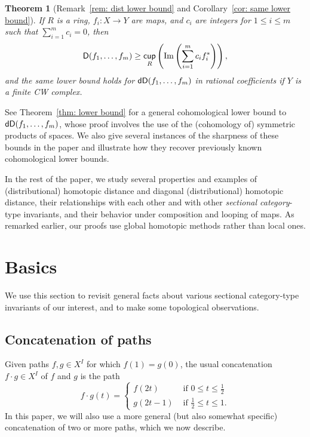 \documentclass[amscd,amssymb,verbatim,10pt]{amsart}
\numberwithin{equation}{section}
\theoremstyle{plain}
\newtheorem{theorem}{Theorem}[section]
\theoremstyle{definition}
\DeclareMathOperator{\cu}{{\mathsf{cup}}}
\def\Im{\protect\operatorname{Im}}
\newcommand{\D}{{\sf {D}}}
\newcommand{\dD}{{\sf {dD}}}
\begin{document}
\begin{theorem}[Remark~\ref{rem: dist lower bound} and Corollary~\ref{cor: same lower bound}]
If $R$ is a ring, $f_i\colon X\to Y$ are maps, and $c_i$ are integers for $1\le i \le m$ 
such that $\sum_{i=1}^mc_i=0$, then
\[
\D(f_1,\dots,f_m)\ge \cu_R\left(\Im\left(\sum_{i=1}^mc_if_i^*\right)\right),
\]
and the same lower bound holds for $\dD(f_1,\dots,f_m)$ in rational coefficients if $Y$ is a finite CW complex.
\end{theorem}
See Theorem~\ref{thm: lower bound} for a general cohomological lower bound to $\dD(f_1,\dots,f_m)$, whose proof involves the use of the (cohomology of) symmetric products of spaces. We also give several instances of the sharpness of these bounds in the paper and illustrate how they recover previously known cohomological lower bounds. 

In the rest of the paper, we study several properties and examples of (distributional) homotopic distance and diagonal (distributional) homotopic distance, their relationships with each other and with other \emph{sectional category}-type invariants, and their behavior under composition and looping of maps. As remarked earlier, our proofs use global homotopic methods rather than local ones.






\section{Basics}\label{sec:basics}
We use this section to revisit general facts about various sectional category-type invariants of our interest, and to make some topological observations.

\subsection{Concatenation of paths}\label{subsec: concat}
Given paths $f,g\in X^I$ for which $f(1)=g(0)$, the usual concatenation $f\cdot g\in X^I$ 
of $f$ and $g$ is the path
\[
f\cdot g(t)=\begin{cases}
    f(2t) & \text{ if }0\le t\le \tfrac{1}{2}
    \\
    g(2t-1) & \text{ if }\tfrac{1}{2}\le t\le 1.
\end{cases}
\]
In this paper, we will also use a more general (but also somewhat specific) concatenation 
of two or more paths, which we now describe.
\end{document}
